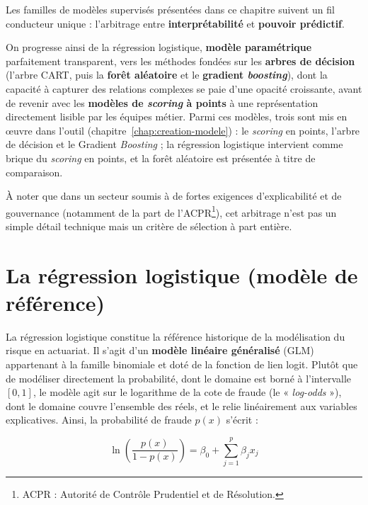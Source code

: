 Les familles de modèles supervisés présentées dans ce chapitre suivent un fil conducteur unique : l'arbitrage entre \textbf{interprétabilité} et \textbf{pouvoir prédictif}.

On progresse ainsi de la régression logistique, \textbf{modèle paramétrique} parfaitement transparent, vers les méthodes fondées sur les \textbf{arbres de décision} (l'arbre CART, puis la \textbf{forêt aléatoire} et le \textbf{gradient \textit{boosting}}), dont la capacité à capturer des relations complexes se paie d'une opacité croissante, avant de revenir avec les \textbf{modèles de \textit{scoring} à points} à une représentation directement lisible par les équipes métier. Parmi ces modèles, trois sont mis en œuvre dans l'outil (chapitre~\ref{chap:creation-modele}) : le \textit{scoring} en points, l'arbre de décision et le Gradient \textit{Boosting} ; la régression logistique intervient comme brique du \textit{scoring} en points, et la forêt aléatoire est présentée à titre de comparaison.

À noter que dans un secteur soumis à de fortes exigences d'explicabilité et de gouvernance (notamment de la part de l'ACPR\footnote{ACPR : Autorité de Contrôle Prudentiel et de Résolution.}), cet arbitrage n'est pas un simple détail technique mais un critère de sélection à part entière.

\section{La régression logistique (modèle de référence)}

La régression logistique constitue la référence historique de la modélisation du risque en actuariat. Il s'agit d'un \textbf{modèle linéaire généralisé} (GLM) appartenant à la famille binomiale et doté de la fonction de lien logit. Plutôt que de modéliser directement la probabilité, dont le domaine est borné à l'intervalle $[0, 1]$, le modèle agit sur le logarithme de la cote de fraude (le « \textit{log-odds} »), dont le domaine couvre l'ensemble des réels, et le relie linéairement aux variables explicatives. Ainsi, la probabilité de fraude $p(x)$ s'écrit :

\begin{equation}
    \ln \left( \frac{p(x)}{1 - p(x)} \right) = \beta_0 + \sum_{j=1}^{p} \beta_j x_j
\end{equation}

